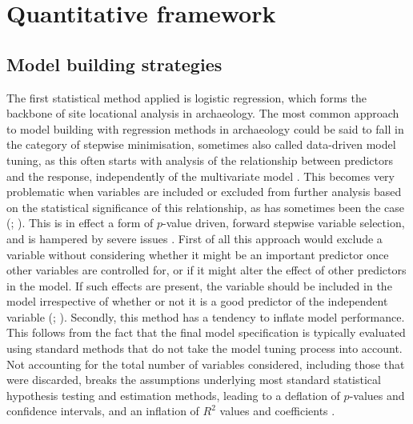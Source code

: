 \documentclass[12pt, a4paper]{article}
\begin{document}
\section{Quantitative framework}
\subsection{Model building strategies}
The first statistical method applied is logistic regression, which forms the backbone of site locational analysis in archaeology. The most common approach to model building with regression methods in archaeology could be said to fall in the category of stepwise minimisation, sometimes also called data-driven model tuning, as this often starts with analysis of the relationship between predictors and the response, independently of the multivariate model \citep[][182--183]{conolly2006}. This becomes very problematic when variables are included or excluded from further analysis based on the statistical significance of this relationship, as has sometimes been the case (\citealp[e.g.][152--153]{stancic2000}; \citealp[][36]{duncan2000}). This is in effect a form of $p$-value driven, forward stepwise variable selection, and is hampered by severe issues \citep[][71--72]{harrell2015}. First of all this approach would exclude a variable without considering whether it might be an important predictor once other variables are controlled for, or if it might alter the effect of other predictors in the model. If such effects are present, the variable should be included in the model irrespective of whether or not it is a good predictor of the independent variable (\citealp[][416]{kohler1986}; \citealp[][89]{james2013}). Secondly, this method has a tendency to inflate model performance. This follows from the fact that the final model specification is typically evaluated using standard methods that do not take the model tuning process into account. Not accounting for the total number of variables considered, including those that were discarded, breaks the assumptions underlying most standard statistical hypothesis testing and estimation methods, leading to a deflation of $p$-values and confidence intervals, and an inflation of $R^2$ values and coefficients \citep{harrell2015}. \par
\end{document}
